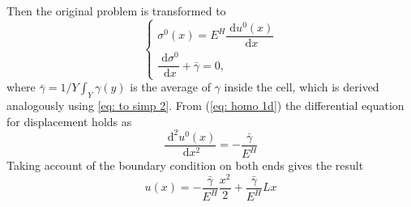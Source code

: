 \documentclass[10pt,a4paper]{scrreprt}
\newcommand{\myd}{\;\mathrm{d}}
\begin{document}
Then the original problem is transformed to
\begin{equation}
\label{eq: homo 1d}
\left\{
\begin{array}{l}
\sigma^{0}(x) = E^{H} \dfrac{\myd{u^{0}(x)}}{\myd{x}} \\
\dfrac{\myd{\sigma^{0}}}{\myd{x}} + \bar{\gamma} = 0,
\end{array}
\right.
\end{equation}
where $\bar{\gamma}=1/Y \int_{Y} \gamma(y)$ is the average of $\gamma$ inside the cell, which is derived analogously using \eqref{eq: to simp 2}. From (\ref{eq: homo 1d}) the differential equation for displacement holds as
\begin{equation}
\dfrac{\myd^2 u^{0}(x)}{\myd{x^{2}}} = -\dfrac{\bar{\gamma}}{E^{H}}
\end{equation}
Taking account of the boundary condition on both ends gives the result
\[u(x) = -\dfrac{\bar{\gamma}}{E^{H}} \dfrac{x^{2}}{2} + \dfrac{\bar{\gamma}}{E^{H}} Lx \]
\end{document}
